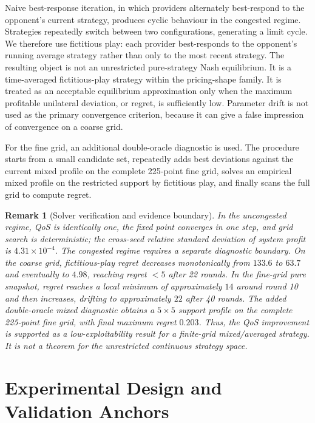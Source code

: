 \documentclass[11pt,a4paper]{article}
\newtheorem{remark}{Remark}
\begin{document}
Naive best-response iteration, in which providers alternately best-respond to the opponent's current strategy, produces cyclic behaviour in the congested regime. Strategies repeatedly switch between two configurations, generating a limit cycle. We therefore use fictitious play: each provider best-responds to the opponent's running average strategy rather than only to the most recent strategy. The resulting object is not an unrestricted pure-strategy Nash equilibrium. It is a time-averaged fictitious-play strategy within the pricing-shape family. It is treated as an acceptable equilibrium approximation only when the maximum profitable unilateral deviation, or regret, is sufficiently low. Parameter drift is not used as the primary convergence criterion, because it can give a false impression of convergence on a coarse grid.

For the fine grid, an additional double-oracle diagnostic is used. The procedure starts from a small candidate set, repeatedly adds best deviations against the current mixed profile on the complete 225-point fine grid, solves an empirical mixed profile on the restricted support by fictitious play, and finally scans the full grid to compute regret.

\begin{remark}[Solver verification and evidence boundary]
In the uncongested regime, QoS is identically one, the fixed point converges in one step, and grid search is deterministic; the cross-seed relative standard deviation of system profit is $4.31\times10^{-4}$. The congested regime requires a separate diagnostic boundary. On the coarse grid, fictitious-play regret decreases monotonically from $133.6$ to $63.7$ and eventually to $4.98$, reaching regret $<5$ after 22 rounds. In the fine-grid pure snapshot, regret reaches a local minimum of approximately $14$ around round 10 and then increases, drifting to approximately $22$ after 40 rounds. The added double-oracle mixed diagnostic obtains a $5\times5$ support profile on the complete 225-point fine grid, with final maximum regret $0.203$. Thus, the QoS improvement is supported as a low-exploitability result for a finite-grid mixed/averaged strategy. It is not a theorem for the unrestricted continuous strategy space.
\end{remark}

\section{Experimental Design and Validation Anchors}
\label{sec:setup}
\end{document}
